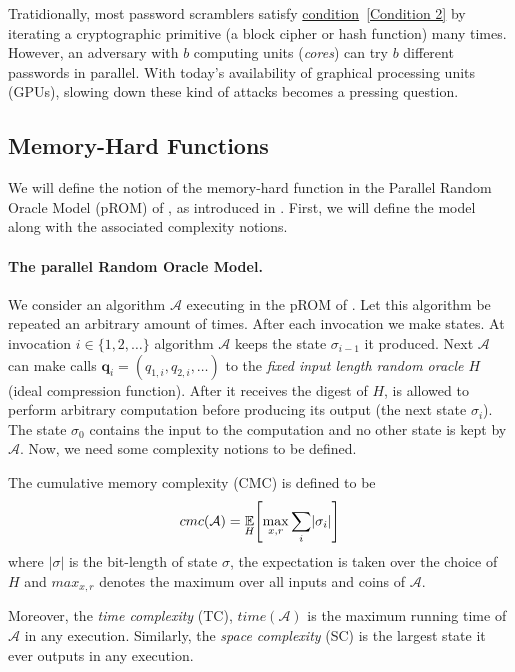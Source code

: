 Tratidionally, most password scramblers satisfy \hyperref[Condition 2]{condition}~\ref{Condition 2} by iterating a cryptographic primitive (a block cipher or hash function) many times. However, an adversary with $b$ computing units (\emph{cores}) can try $b$ different passwords in parallel. With today's availability of graphical processing units (GPUs), slowing down these kind of attacks becomes a pressing question.

\subsection{Memory-Hard Functions} \label{sec:memory-hard}
We will define the notion of the memory-hard function in the Parallel Random Oracle Model (pROM) of \cite{Alwen:2015:HPC:2746539.2746622}, as introduced in \cite{cryptoeprint:2016:875}. First, we will define the model along with the associated complexity notions.

\paragraph{The parallel Random Oracle Model.} We consider an algorithm $\mathcal{A}$ executing in the pROM of \cite{Alwen:2015:HPC:2746539.2746622}. Let this algorithm be repeated an arbitrary amount of times. After each invocation we make states. At invocation $i \in \{ 1,2, \dots \}$ algorithm $\mathcal{A}$ keeps the state $\sigma_{i-1}$ it produced. Next $\mathcal{A}$ can make calls $\textbf{q}_i = (q_{1,i}, q_{2,i}, \dots)$
to the \emph{fixed input length random oracle $H$} (ideal compression function). After it receives the digest of $H$, is allowed to perform arbitrary computation before producing its output (the next state $\sigma_i$). The state $\sigma_0$ contains the input to the computation and no other state is kept by $\mathcal{A}$. Now, we need some complexity notions to be defined.

The cumulative memory complexity (CMC) is defined to be
\begin{equation} \nonumber
    cmc(\mathcal{A}) = \underset{H}{\mathbb{E}} \Bigg{[} \underset{x,r}{\max} \sum_{i} \lvert \sigma_i \rvert \Bigg{]}
\end{equation}
where $\lvert \sigma \rvert$ is the bit-length of state $\sigma$, the expectation is taken over the choice of $H$ and $max_{x,r}$ denotes the maximum over all inputs and coins of $\mathcal{A}$.

Moreover, the \emph{time complexity} (TC), $time(\mathcal{A})$ is the maximum running time of $\mathcal{A}$ in any execution. Similarly, the \emph{space complexity} (SC) is the largest state it ever outputs in any execution.

